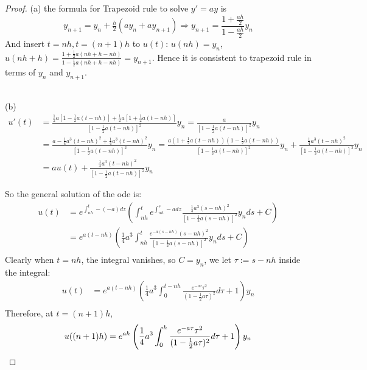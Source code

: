 \documentclass[a4paper, 10pt]{article}
\theoremstyle{definition}
\theoremstyle{hSol}
\begin{document}
\begin{proof} (a) the formula for Trapezoid rule to solve $y'=ay$ is
$$
y_{n+1} = y_n + \tfrac{h}{2}(ay_n+ay_{n+1}) \Rightarrow y_{n+1} = \frac{1+\frac{ah}{2}}{1-\frac{ah}{2}}y_n
$$
And insert $t=nh, t=(n+1)h$ to $u(t)$: $u(nh)=y_n$, $u(nh+h)=\frac{1+\frac{1}{2}a(nh+h-nh)}{1-\frac{1}{2}a(nh+h-nh)}=y_{n+1}$. Hence it is consistent to trapezoid rule in terms of $y_n$ and $y_{n+1}$.

~\\
(b)
\begin{equation}
  \begin{split}
    u'(t) &= \frac{\frac{1}{2}a[1-\frac{1}{2}a(t-nh)]+\frac{1}{2}a[1+\frac{1}{2}a(t-nh)]}{[1-\frac{1}{2}a(t-nh)]^2} y_n =\frac{a}{[1-\frac{1}{2}a(t-nh)]^2} y_n \\
    &=\frac{a-\frac{1}{4}a^3(t-nh)^2+\frac{1}{4}a^3(t-nh)^2}{[1-\frac{1}{2}a(t-nh)]^2} y_n
    = \frac{a(1+\frac{1}{2}a(t-nh))(1-\frac{1}{2}a(t-nh))}{[1-\frac{1}{2}a(t-nh)]^2} y_n + \frac{\frac{1}{4}a^3(t-nh)^2}{[1-\frac{1}{2}a(t-nh)]^2}y_n \\
    &= au(t) + \frac{\frac{1}{4}a^3(t-nh)^2}{[1-\frac{1}{2}a(t-nh)]^2}y_n
  \end{split}
\end{equation}

So the general solution of the ode is:
\begin{equation}
  \begin{split}
    u(t) &= e^{\int_{nh}^t -(-a)dz}\left(\int_{nh}^t e^{\int_{nh}^s -adz}\frac{\frac{1}{4}a^3(s-nh)^2}{[1-\frac{1}{2}a(s-nh)]^2}y_nds+C\right)\\
    & = e^{a(t-nh)}\left(\frac{1}{4}a^3\int_{nh}^t \frac{e^{-a(s-nh)}(s-nh)^2}{[1-\frac{1}{2}a(s-nh)]^2}y_nds+C\right)\\
  \end{split}
\end{equation}
Clearly when $t=nh$, the integral vanishes, so $C=y_n$, we let $\tau:=s-nh$ inside the integral:
\begin{equation}
  \begin{split}
    u(t) &= e^{a(t-nh)}\left(\frac{1}{4}a^3\int_{0}^{t-nh} \frac{e^{-a\tau}\tau^2}{(1-\frac{1}{2}a\tau)^2}d\tau+1\right)y_n\\
  \end{split}
\end{equation}
Therefore, at $t=(n+1)h$,
$$
u((n+1)h) = e^{ah}\left(\frac{1}{4}a^3\int_{0}^{h} \frac{e^{-a\tau}\tau^2}{(1-\frac{1}{2}a\tau)^2}d\tau+1\right)y_n\\
$$


\end{proof}
\end{document}
